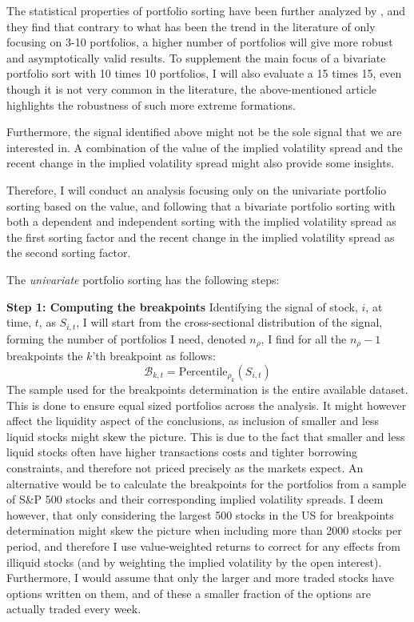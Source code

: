 The statistical properties of portfolio sorting have been further analyzed by \cite{cattaneo2020characteristic}, and they find that contrary to what has been the trend in the literature of only focusing on 3-10 portfolios, a higher number of portfolios will give more robust and asymptotically valid results. To supplement the main focus of a bivariate portfolio sort with 10 times 10 portfolios, I will also evaluate a 15 times 15, even though it is not very common in the literature, the above-mentioned article highlights the robustness of such more extreme formations.

Furthermore, the signal identified above might not be the sole signal that we are interested in. A combination of the value of the implied volatility spread and the recent change in the implied volatility spread might also provide some insights. 

Therefore, I will conduct an analysis focusing only on the univariate portfolio sorting based on the value, and following that a bivariate portfolio sorting with both a dependent and independent sorting with the implied volatility spread as the first sorting factor and the recent change in the implied volatility spread as the second sorting factor.

The \textit{univariate} portfolio sorting has the following steps:

\textbf{Step 1: Computing the breakpoints } Identifying the signal of stock, $i$, at time, $t$, as $S_{i,t}$, I will start from the cross-sectional distribution of the signal, forming the number of portfolios I need, denoted $n_{\rho}$, I find for all the $n_{\rho}-1$ breakpoints the $k$'th breakpoint as follows:
\begin{equation}\label{eq:step1uni}
	\mathcal{B}_{k,t}=\text{Percentile}_{\rho_{k}}\left(S_{i,t}\right)
\end{equation}
The sample used for the breakpoints determination is the entire available dataset. This is done to ensure equal sized portfolios across the analysis. It might however affect the liquidity aspect of the conclusions, as inclusion of smaller and less liquid stocks might skew the picture. This is due to the fact that smaller and less liquid stocks often have higher transactions costs and tighter borrowing constraints, and therefore not priced precisely as the markets expect. An alternative would be to calculate the breakpoints for the portfolios from a sample of S\&P 500 stocks and their corresponding implied volatility spreads. I deem however, that only considering the largest 500 stocks in the US for breakpoints determination might skew the picture when including more than 2000 stocks per period, and therefore I use value-weighted returns to correct for any effects from illiquid stocks (and by weighting the implied volatility by the open interest). Furthermore, I would assume that only the larger and more traded stocks have options written on them, and of these a smaller fraction of the options are actually traded every week.


